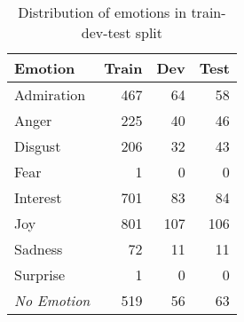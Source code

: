 \begin{table}[t]
	\centering
	\begin{tabular}{lrrr}
		\toprule
		\textbf{Emotion} & \textbf{Train} & \textbf{Dev} & \textbf{Test} \\ \midrule
		Admiration & 467 & 64 & 58\\ %
        Anger & 225 & 40 & 46\\ %
        Disgust & 206 & 32 & 43\\ %
         Fear & 1 & 0 & 0\\ %
        Interest & 701 & 83 & 84\\ %
        Joy & 801 & 107 & 106\\ %
        Sadness & 72 & 11 & 11\\ %
         Surprise & 1 & 0 & 0\\ %
         \emph{No Emotion} & 519 & 56 & 63\\\bottomrule
	\end{tabular}
	\caption{Distribution of emotions in train-dev-test split}
	\label{tab:traindevtestsplit}
\end{table}
